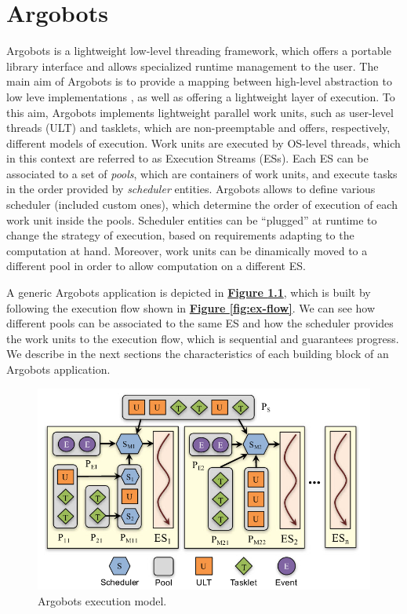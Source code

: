 \chapter{Argobots}
\label{sec:argobots}
Argobots \cite{argobots-paper, argobot} is a lightweight low-level threading framework, which offers a portable library interface and allows specialized runtime management to the user. The main aim of Argobots is to provide a mapping between high-level abstraction to low leve implementations \cite{argobots-paper}, as well as offering a lightweight layer of execution. To this aim, Argobots implements lightweight parallel work units, such as user-level threads (ULT) and tasklets, which are non-preemptable and offers, respectively, different models of execution. Work units are executed by OS-level threads, which in this context are referred to as Execution Streams (ESs). Each ES can be associated to a set of \textit{pools}, which are containers of work units, and execute tasks in the order provided by \textit{scheduler} entities. Argobots allows to define various scheduler (included custom ones), which determine the order of execution of each work unit inside the pools. Scheduler entities can be ``plugged'' at runtime to change the strategy of execution, based on requirements adapting to the computation at hand. Moreover, work units can be dinamically moved to a different pool in order to allow computation on a different ES.\newline

A generic Argobots application is depicted in \hyperref[fig:argobot-app]{\textbf{Figure \ref{fig:argobot-app}}}, which is built by following the execution flow shown in \hyperref[fig:ex-flow]{\textbf{Figure \ref{fig:ex-flow}}}. We can see how different pools can be associated to the same ES and how the scheduler provides the work units to the execution flow, which is sequential and guarantees progress. We describe in the next sections the characteristics of each building block of an Argobots application.

\begin{figure}[H]
    \centering
    \includegraphics[width=0.8\linewidth]{res/argobot_application.png}
    \caption{Argobots execution model.}
    \label{fig:argobot-app}
\end{figure}

